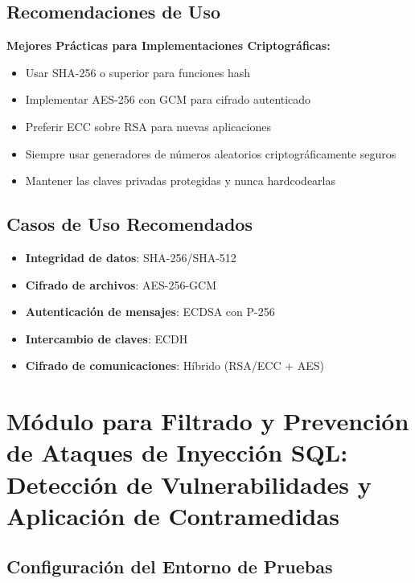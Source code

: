 \documentclass[12pt,a4paper]{article}
\begin{document}
\subsection{Recomendaciones de Uso}

\begin{securitygoodpractice}
	\textbf{Mejores Prácticas para Implementaciones Criptográficas:}
	\begin{itemize}
		\item Usar SHA-256 o superior para funciones hash
		\item Implementar AES-256 con GCM para cifrado autenticado
		\item Preferir ECC sobre RSA para nuevas aplicaciones
		\item Siempre usar generadores de números aleatorios criptográficamente seguros
		\item Mantener las claves privadas protegidas y nunca hardcodearlas
	\end{itemize}
\end{securitygoodpractice}

\subsection{Casos de Uso Recomendados}

\begin{itemize}
	\item \textbf{Integridad de datos}: SHA-256/SHA-512
	\item \textbf{Cifrado de archivos}: AES-256-GCM
	\item \textbf{Autenticación de mensajes}: ECDSA con P-256
	\item \textbf{Intercambio de claves}: ECDH
	\item \textbf{Cifrado de comunicaciones}: Híbrido (RSA/ECC + AES)
\end{itemize}

\section{Módulo para Filtrado y Prevención de Ataques de Inyección SQL: Detección de Vulnerabilidades y Aplicación de Contramedidas}

\subsection{Configuración del Entorno de Pruebas}
\end{document}
